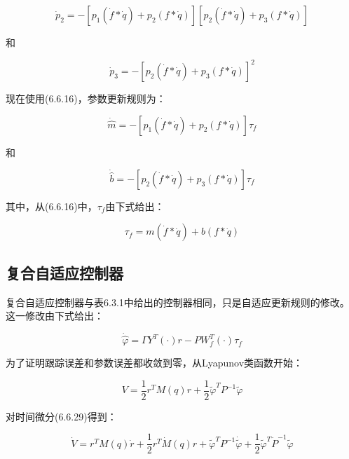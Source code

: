 \documentclass[12pt,a4paper]{ctexart}
\begin{document}
\begin{equation}
\dot{p}_2 = -[p_1(\dot{f} * \dot{q}) + p_2(f * \dot{q})][p_2(\dot{f} * \dot{q}) + p_3(f * \dot{q})]
\end{equation}

和

\begin{equation}
\dot{p}_3 = -[p_2(\dot{f} * \dot{q}) + p_3(f * \dot{q})]^2
\end{equation}

现在使用(6.6.16)，参数更新规则为：

\begin{equation}
\dot{\hat{m}} = -[p_1(\dot{f} * \dot{q}) + p_2(f * \dot{q})]\tau_f
\end{equation}

和

\begin{equation}
\dot{\hat{b}} = -[p_2(\dot{f} * \dot{q}) + p_3(f * \dot{q})]\tau_f
\end{equation}

其中，从(6.6.16)中，$\tau_f$由下式给出：

\begin{equation}
\tau_f = m(\dot{f} * \dot{q}) + b(f * \dot{q})
\end{equation}

\subsection*{复合自适应控制器}

复合自适应控制器与表6.3.1中给出的控制器相同，只是自适应更新规则的修改。这一修改由下式给出：

\begin{equation}\label{eq:composite}
\dot{\hat{\varphi}} = \Gamma Y^T(\cdot)r - P W_f^T(\cdot)\tau_f
\end{equation}

为了证明跟踪误差和参数误差都收敛到零，从Lyapunov类函数开始：

\begin{equation}\label{eq:lyapunov-composite}
V = \frac{1}{2}r^T M(q) r + \frac{1}{2}\tilde{\varphi}^T P^{-1} \tilde{\varphi}
\end{equation}

对时间微分(6.6.29)得到：

\begin{equation}\label{eq:v-deriv-composite}
\dot{V} = r^T M(q)\dot{r} + \frac{1}{2}r^T \dot{M}(q)r + \tilde{\varphi}^T P^{-1} \dot{\tilde{\varphi}} + \frac{1}{2}\tilde{\varphi}^T \dot{P}^{-1} \tilde{\varphi}
\end{equation}
\end{document}
